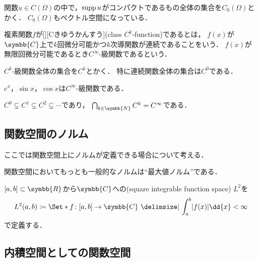 \documentclass[../sotsu.tex]{subfiles}
\begin{document}
関数$u \in C(\Omega)$の中で，$\operatorname{supp} u$がコンパクトであるもの全体の集合を$C_0 (\Omega)$とかく．
$C_0 (\Omega)$もベクトル空間になっている．


\begin{definition}
    \label{dfn:class-C^k-function}
    複素関数$f$が[][Cきゆうかんすう](class $C^k$-function)であるとは，
    $f(x)$が$\symbb{C}$上で$k$回微分可能かつ$k$次導関数が連続であることをいう．
    $f(x)$が無限回微分可能であるとき$C^\infty$-級関数であるという．

    $C^k$-級関数全体の集合を$C^k$とかく．
    特に連続関数全体の集合は$C^0$である．
\end{definition}

\begin{example}
    $e^x$，$\sin x$，$\cos x$は$C^\infty$-級関数である．
\end{example}

\begin{example}
    $C^0 \subsetneq C^1 \subsetneq C^2 \subsetneq \dotsb$であり，
    $\bigcap_{k \in \symbb{N}} C^k = C^\infty$である．
\end{example}



\subsection{関数空間のノルム}

ここでは関数空間上にノルムが定義できる場合について考える．

関数空間においてもっとも一般的なノルムは``最大値ノルム''である．

\begin{definition}
    \label{dfn:square-integrable-function-space}
    $[a, b] \subset \symbb{R}$から$\symbb{C}$への(square integrable function space) $L^2$を
    \begin{equation*}
        L^2 (a, b) \coloneq \Set*{ f \colon [a, b] \to \symbb{C}  \given  \int_a^b \abs{f(x)} \dd{x} < \infty }
    \end{equation*}
    で定義する．
\end{definition}





\subsection{内積空間としての関数空間}
\end{document}

